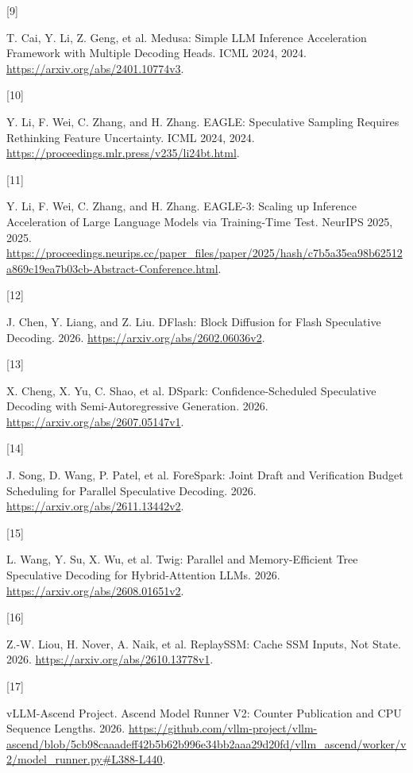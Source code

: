 \documentclass[
  a4paper,
  UTF8,
  fontset=none,
  zihao=5]{ctexart}
\newlength{\cslhangindent}
\newlength{\csllabelwidth}
\newenvironment{CSLReferences}[2] %
 {\begin{list}{}{%
  \setlength{\itemindent}{0pt}
  \setlength{\leftmargin}{0pt}
  \setlength{\parsep}{0pt}
  \ifodd #1
   \setlength{\leftmargin}{\cslhangindent}
   \setlength{\itemindent}{-1\cslhangindent}
  \fi
  \setlength{\itemsep}{#2\baselineskip}}}
 {\end{list}}
\newcommand{\CSLLeftMargin}[1]{\parbox[t]{\csllabelwidth}{\strut#1\strut}}
\newcommand{\CSLRightInline}[1]{\parbox[t]{\linewidth - \csllabelwidth}{\strut#1\strut}}
\begin{document}
\begin{CSLReferences}{0}{0}
\CSLLeftMargin{{[}9{]} }%
\CSLRightInline{T. Cai, Y. Li, Z. Geng, et al. {Medusa: Simple LLM
Inference Acceleration Framework with Multiple Decoding Heads}. ICML
2024, 2024. \url{https://arxiv.org/abs/2401.10774v3}.}

\CSLLeftMargin{{[}10{]} }%
\CSLRightInline{Y. Li, F. Wei, C. Zhang, and H. Zhang. {EAGLE:
Speculative Sampling Requires Rethinking Feature Uncertainty}. ICML
2024, 2024. \url{https://proceedings.mlr.press/v235/li24bt.html}.}

\CSLLeftMargin{{[}11{]} }%
\CSLRightInline{Y. Li, F. Wei, C. Zhang, and H. Zhang. {EAGLE-3: Scaling
up Inference Acceleration of Large Language Models via Training-Time
Test}. NeurIPS 2025, 2025.
\url{https://proceedings.neurips.cc/paper_files/paper/2025/hash/c7b5a35ea98b62512a869c19ea7b03cb-Abstract-Conference.html}.}

\CSLLeftMargin{{[}12{]} }%
\CSLRightInline{J. Chen, Y. Liang, and Z. Liu. {DFlash: Block Diffusion
for Flash Speculative Decoding}. 2026.
\url{https://arxiv.org/abs/2602.06036v2}.}

\CSLLeftMargin{{[}13{]} }%
\CSLRightInline{X. Cheng, X. Yu, C. Shao, et al. {DSpark:
Confidence-Scheduled Speculative Decoding with Semi-Autoregressive
Generation}. 2026. \url{https://arxiv.org/abs/2607.05147v1}.}

\CSLLeftMargin{{[}14{]} }%
\CSLRightInline{J. Song, D. Wang, P. Patel, et al. {ForeSpark: Joint
Draft and Verification Budget Scheduling for Parallel Speculative
Decoding}. 2026. \url{https://arxiv.org/abs/2611.13442v2}.}

\CSLLeftMargin{{[}15{]} }%
\CSLRightInline{L. Wang, Y. Su, X. Wu, et al. {Twig: Parallel and
Memory-Efficient Tree Speculative Decoding for Hybrid-Attention LLMs}.
2026. \url{https://arxiv.org/abs/2608.01651v2}.}

\CSLLeftMargin{{[}16{]} }%
\CSLRightInline{Z.-W. Liou, H. Nover, A. Naik, et al. {ReplaySSM: Cache
SSM Inputs, Not State}. 2026. \url{https://arxiv.org/abs/2610.13778v1}.}

\CSLLeftMargin{{[}17{]} }%
\CSLRightInline{vLLM-Ascend Project. {Ascend Model Runner V2: Counter
Publication and CPU Sequence Lengths}. 2026.
\url{https://github.com/vllm-project/vllm-ascend/blob/5cb98caaadeff42b5b62b996e34bb2aaa29d20fd/vllm_ascend/worker/v2/model_runner.py\#L388-L440}.}


\end{CSLReferences}
\end{document}
